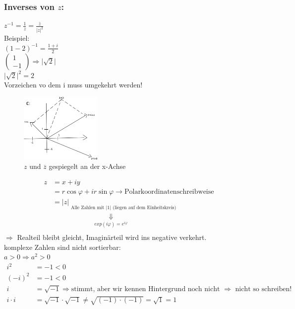 \subsubsection{Inverses von $z$:}
$z^{-1}=\frac{1}{z}=\frac{\overline{z}}{\vert z \vert^{2}}$\\
Beispiel:\\
$(1-2)^{-1}=\frac{1+i}{2}$\\
$\begin{pmatrix} 1 \\ -1 \end{pmatrix}\Rightarrow\vert\sqrt{2}\vert$\\
$\vert\sqrt{2}\vert^{2}=2$\\
Vorzeichen vo dem i muss umgekehrt werden!
\begin{figure}
\centering
\includegraphics[width=0.35\textwidth]{mainmatter/chapter3/pics/zrechnungen.png}
\caption{$z$ und $\overline{z}$ gespiegelt an der x-Achse}
\end{figure}
\begin{align}
z &= x+iy\\
&= r\cos\varphi + ir\sin\varphi \rightarrow \text{Polarkoordinatenschreibweise}\\
&= \vert z \vert \mathop{\underbrace{(\cos\varphi+i\sin\varphi)}}\limits_{\text{Alle Zahlen mit } \vert 1 \vert \text{ (liegen auf dem Einheitskreis) }}\\
&\qquad \qquad \qquad \mathop{\Downarrow}\limits_{exp(i\varphi)=e^{i\varphi}}\\
\end{align}
$\Rightarrow$ Realteil bleibt gleicht, Imaginärteil wird ins negative verkehrt.\\
komplexe Zahlen sind nicht sortierbar:\\
$a>0\Rightarrow a^{2}>0$\\
\begin{align}
i^{2} &= -1 < 0\\
(-i)^{2} &= -1<0\\
i &=\sqrt{-1} \Rightarrow \text{stimmt, aber wir kennen Hintergrund noch nicht } \Rightarrow \text{ nicht so schreiben! }\\
i\cdot i &= \sqrt{-1}\cdot\sqrt{-1} \neq \sqrt{(-1)\cdot(-1)}=\sqrt{1}=1
\end{align}
